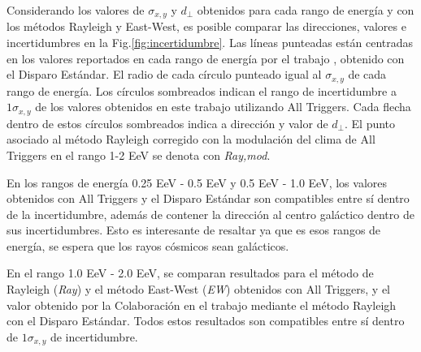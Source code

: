\documentclass[12pt, doublespace, oneside]{article}
\begin{document}
    Considerando los valores de $\sigma_{x,y}$ y $d_\perp$ obtenidos para cada rango de energía y con los métodos Rayleigh y East-West, es posible  comparar las direcciones, valores e incertidumbres en la Fig.\ref{fig:incertidumbre}. Las líneas punteadas están centradas en los valores reportados  en cada rango de energía por el trabajo \cite{Aab_2020}, obtenido con el Disparo Estándar. El  radio de cada círculo punteado igual al $\sigma_{x,y}$ de cada rango de energía. Los círculos sombreados indican el rango de incertidumbre  a $1\sigma_{x,y}$ de los valores obtenidos en este trabajo utilizando All Triggers. Cada flecha dentro de estos círculos sombreados indica a dirección y valor de $d_\perp$.    El punto asociado al método Rayleigh corregido con la modulación del clima de All Triggers en el rango 1-2 EeV se denota con \emph{Ray,mod}.


    En los rangos de energía 0.25 EeV - 0.5 EeV y 0.5 EeV - 1.0 EeV, los valores obtenidos con All Triggers y el Disparo Estándar son compatibles entre sí dentro de la incertidumbre, además de contener la dirección al centro galáctico dentro de sus incertidumbres. Esto es interesante de resaltar ya que es esos rangos de energía, se espera que los rayos cósmicos sean galácticos.

    En el rango 1.0 EeV - 2.0 EeV, se comparan resultados para el método de Rayleigh (\emph{Ray}) y el método East-West (\emph{EW}) obtenidos con All Triggers, y el valor obtenido por la Colaboración en el trabajo \cite{Aab_2020} mediante el método Rayleigh con el Disparo Estándar. Todos estos resultados son compatibles entre sí dentro de $1\sigma_{x,y}$ de incertidumbre. 
\end{document}
